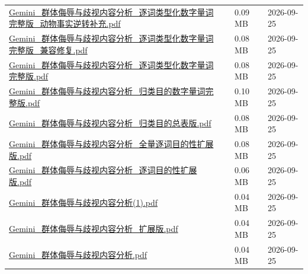 \documentclass[UTF8,fontset=fandol,10pt,a4paper]{ctexart}
\begin{document}
\begin{longtable}{@{}L{\dimexpr\linewidth-50mm-6\tabcolsep\relax}R{8mm}R{16mm}R{26mm}@{}}
\href{https://chatgpt.com/library?file_id=libfile_c35b346bddb881918c04d85136f72673&account_id=personal}{Gemini\_\allowbreak{}群体侮辱与歧视内容分析\_\allowbreak{}逐词类型化数字量词完整版\_\allowbreak{}动物事实逆转补充.\allowbreak{}pdf} & \textemdash{} & 0.09 MB & 2026-09-25 \\
\href{https://chatgpt.com/library?file_id=libfile_12651605e8648191943be0826dcf4ad7&account_id=personal}{Gemini\_\allowbreak{}群体侮辱与歧视内容分析\_\allowbreak{}逐词类型化数字量词完整版\_\allowbreak{}兼容修复.\allowbreak{}pdf} & \textemdash{} & 0.08 MB & 2026-09-25 \\
\href{https://chatgpt.com/library?file_id=libfile_38c14f19fe28819184b9f41b4b150ced&account_id=personal}{Gemini\_\allowbreak{}群体侮辱与歧视内容分析\_\allowbreak{}逐词类型化数字量词完整版.\allowbreak{}pdf} & \textemdash{} & 0.08 MB & 2026-09-25 \\
\href{https://chatgpt.com/library?file_id=libfile_e81bd83cce048191ad740228d2d266a0&account_id=personal}{Gemini\_\allowbreak{}群体侮辱与歧视内容分析\_\allowbreak{}归类目的数字量词完整版.\allowbreak{}pdf} & \textemdash{} & 0.10 MB & 2026-09-25 \\
\href{https://chatgpt.com/library?file_id=libfile_92a6dae4999481919bd9174f6ba85254&account_id=personal}{Gemini\_\allowbreak{}群体侮辱与歧视内容分析\_\allowbreak{}归类目的总表版.\allowbreak{}pdf} & \textemdash{} & 0.08 MB & 2026-09-25 \\
\href{https://chatgpt.com/library?file_id=libfile_0f8fdc7ae47481918bfb0e91a18d989c&account_id=personal}{Gemini\_\allowbreak{}群体侮辱与歧视内容分析\_\allowbreak{}全量逐词目的性扩展版.\allowbreak{}pdf} & \textemdash{} & 0.08 MB & 2026-09-25 \\
\href{https://chatgpt.com/library?file_id=libfile_224eef3f40d4819183020e7f576de776&account_id=personal}{Gemini\_\allowbreak{}群体侮辱与歧视内容分析\_\allowbreak{}逐词目的性扩展版.\allowbreak{}pdf} & \textemdash{} & 0.06 MB & 2026-09-25 \\
\href{https://chatgpt.com/library?file_id=libfile_58168d5783c88191bda73cd6a7013cc7&account_id=personal}{Gemini\_\allowbreak{}群体侮辱与歧视内容分析(1).\allowbreak{}pdf} & \textemdash{} & 0.04 MB & 2026-09-25 \\
\href{https://chatgpt.com/library?file_id=libfile_c95f4db7bae08191a0e38a23b47c549a&account_id=personal}{Gemini\_\allowbreak{}群体侮辱与歧视内容分析\_\allowbreak{}扩展版.\allowbreak{}pdf} & \textemdash{} & 0.04 MB & 2026-09-25 \\
\href{https://chatgpt.com/library?file_id=libfile_14294b7841f08191830d5e9b69ec11bd&account_id=personal}{Gemini\_\allowbreak{}群体侮辱与歧视内容分析.\allowbreak{}pdf} & \textemdash{} & 0.04 MB & 2026-09-25 \\

\end{longtable}
\end{document}
